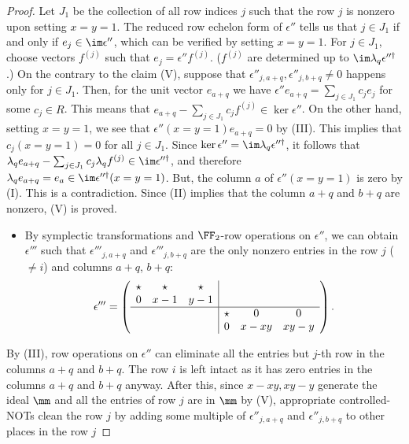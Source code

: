 \begin{proof}
Let $J_1$ be the collection of all row indices $j$
such that the row $j$ is nonzero upon setting $x=y=1$.
The reduced row echelon form of $\epsilon''$ tells us that
$j \in J_1$ if and only if $e_j \in \im \epsilon''$,
which can be verified by setting $x=y=1$.
For $j \in J_1$, choose vectors $f^{(j)}$ such that $e_j = \epsilon'' f^{(j)}$.
($f^{(j)}$ are determined up to $\im \lambda_q \epsilon''^\dagger$.)
On the contrary to the claim (V), suppose that 
$\epsilon''_{j,a+q}, \epsilon''_{j,b+q} \neq 0$ happens only for $j \in J_1$.
Then, for the unit vector $e_{a+q}$ we have 
$\epsilon'' e_{a+q} = \sum_{j \in J_1} c_j e_j$
for some $c_j \in R$.
This means that $e_{a+q} - \sum_{j \in J_1} c_j f^{(j)} \in \ker \epsilon''$.
On the other hand, setting $x=y=1$, we see that $\epsilon''(x=y=1)e_{a+q} = 0$ by (III).
This implies that $c_j(x=y=1) = 0$ for all $j \in J_1$.
Since $\ker \epsilon'' = \im \lambda_q \epsilon''^\dagger$,
it follows that $\lambda_q e_{a+q} - \sum_{j\in J_1} c_j \lambda_q f^{(j)} \in \im \epsilon''^\dagger$,
and therefore $\lambda_q e_{a+q} = e_a \in \im \epsilon''^\dagger(x=y=1)$.
But, the column $a$ of $\epsilon''(x=y=1)$ is zero by (I).
This is a contradiction. Since (II) implies that the column $a+q$ and $b+q$ are nonzero,
(V) is proved.
\begin{itemize}
\item [(VI)] By symplectic transformations and $\FF_2$-row operations on $\epsilon''$,
we can obtain $\epsilon'''$ such that $\epsilon'''_{j,a+q}$ and $\epsilon'''_{j,b+q}$
are the only nonzero entries in the row $j$ ($\neq i$) and columns $a+q$, $b+q$:
\begin{align}
\epsilon''' = \left(\begin{array}{ccc|ccc}
\star & \star &  \star &&&\\
0 & x-1  & y-1 & &&\\
\hline
&&& \star&0& 0\\
&&&  0& x-xy & xy-y \\
\end{array}\right).
\end{align}
\end{itemize}
By (III), row operations on $\epsilon''$ can eliminate all the entries but $j$-th row 
in the columns $a+q$ and $b+q$.
The row $i$ is left intact as it has zero entries in the columns $a+q$ and $b+q$ anyway.
After this, since $x-xy, xy-y$ generate the ideal $\mm$ and all the entries of row $j$
are in $\mm$ by (V), appropriate controlled-NOTs clean the row $j$
by adding some multiple of $\epsilon''_{j,a+q}$ and $\epsilon''_{j,b+q}$ to other places in the row $j$

\end{proof}
